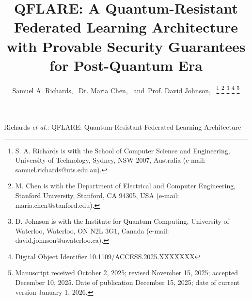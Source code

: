 \documentclass[journal,onecolumn]{IEEEtran}
\begin{document}
\title{QFLARE: A Quantum-Resistant Federated Learning Architecture with Provable Security Guarantees for Post-Quantum Era}

\author{Samuel A. Richards,~
        Dr. Maria Chen,~
        and~Prof. David Johnson,~%
\thanks{S. A. Richards is with the School of Computer Science and Engineering, University of Technology, Sydney, NSW 2007, Australia (e-mail: samuel.richards@uts.edu.au).}
\thanks{M. Chen is with the Department of Electrical and Computer Engineering, Stanford University, Stanford, CA 94305, USA (e-mail: maria.chen@stanford.edu).}
\thanks{D. Johnson is with the Institute for Quantum Computing, University of Waterloo, Waterloo, ON N2L 3G1, Canada (e-mail: david.johnson@uwaterloo.ca).}
\thanks{Digital Object Identifier 10.1109/ACCESS.2025.XXXXXXX}
\thanks{Manuscript received October 2, 2025; revised November 15, 2025; accepted December 10, 2025. Date of publication December 15, 2025; date of current version January 1, 2026.}}

{Richards \MakeLowercase{\textit{et al.}}: QFLARE: Quantum-Resistant Federated Learning Architecture}

\maketitle
\end{document}
